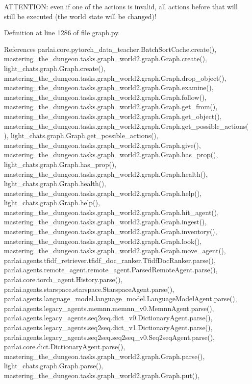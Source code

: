 \begin{DoxyVerb}ATTENTION: even if one of the actions is invalid, all actions before that will still be executed (the world state will be changed)!\end{DoxyVerb}
 

Definition at line 1286 of file graph.\+py.



References parlai.\+core.\+pytorch\+\_\+data\+\_\+teacher.\+Batch\+Sort\+Cache.\+create(), mastering\+\_\+the\+\_\+dungeon.\+tasks.\+graph\+\_\+world2.\+graph.\+Graph.\+create(), light\+\_\+chats.\+graph.\+Graph.\+create(), mastering\+\_\+the\+\_\+dungeon.\+tasks.\+graph\+\_\+world2.\+graph.\+Graph.\+drop\+\_\+object(), mastering\+\_\+the\+\_\+dungeon.\+tasks.\+graph\+\_\+world2.\+graph.\+Graph.\+examine(), mastering\+\_\+the\+\_\+dungeon.\+tasks.\+graph\+\_\+world2.\+graph.\+Graph.\+follow(), mastering\+\_\+the\+\_\+dungeon.\+tasks.\+graph\+\_\+world2.\+graph.\+Graph.\+get\+\_\+from(), mastering\+\_\+the\+\_\+dungeon.\+tasks.\+graph\+\_\+world2.\+graph.\+Graph.\+get\+\_\+object(), mastering\+\_\+the\+\_\+dungeon.\+tasks.\+graph\+\_\+world2.\+graph.\+Graph.\+get\+\_\+possible\+\_\+actions(), light\+\_\+chats.\+graph.\+Graph.\+get\+\_\+possible\+\_\+actions(), mastering\+\_\+the\+\_\+dungeon.\+tasks.\+graph\+\_\+world2.\+graph.\+Graph.\+give(), mastering\+\_\+the\+\_\+dungeon.\+tasks.\+graph\+\_\+world2.\+graph.\+Graph.\+has\+\_\+prop(), light\+\_\+chats.\+graph.\+Graph.\+has\+\_\+prop(), mastering\+\_\+the\+\_\+dungeon.\+tasks.\+graph\+\_\+world2.\+graph.\+Graph.\+health(), light\+\_\+chats.\+graph.\+Graph.\+health(), mastering\+\_\+the\+\_\+dungeon.\+tasks.\+graph\+\_\+world2.\+graph.\+Graph.\+help(), light\+\_\+chats.\+graph.\+Graph.\+help(), mastering\+\_\+the\+\_\+dungeon.\+tasks.\+graph\+\_\+world2.\+graph.\+Graph.\+hit\+\_\+agent(), mastering\+\_\+the\+\_\+dungeon.\+tasks.\+graph\+\_\+world2.\+graph.\+Graph.\+ingest(), mastering\+\_\+the\+\_\+dungeon.\+tasks.\+graph\+\_\+world2.\+graph.\+Graph.\+inventory(), mastering\+\_\+the\+\_\+dungeon.\+tasks.\+graph\+\_\+world2.\+graph.\+Graph.\+look(), mastering\+\_\+the\+\_\+dungeon.\+tasks.\+graph\+\_\+world2.\+graph.\+Graph.\+move\+\_\+agent(), parlai.\+agents.\+tfidf\+\_\+retriever.\+tfidf\+\_\+doc\+\_\+ranker.\+Tfidf\+Doc\+Ranker.\+parse(), parlai.\+agents.\+remote\+\_\+agent.\+remote\+\_\+agent.\+Parsed\+Remote\+Agent.\+parse(), parlai.\+core.\+torch\+\_\+agent.\+History.\+parse(), parlai.\+agents.\+starspace.\+starspace.\+Starspace\+Agent.\+parse(), parlai.\+agents.\+language\+\_\+model.\+language\+\_\+model.\+Language\+Model\+Agent.\+parse(), parlai.\+agents.\+legacy\+\_\+agents.\+memnn.\+memnn\+\_\+v0.\+Memnn\+Agent.\+parse(), parlai.\+agents.\+legacy\+\_\+agents.\+seq2seq.\+dict\+\_\+v0.\+Dictionary\+Agent.\+parse(), parlai.\+agents.\+legacy\+\_\+agents.\+seq2seq.\+dict\+\_\+v1.\+Dictionary\+Agent.\+parse(), parlai.\+agents.\+legacy\+\_\+agents.\+seq2seq.\+seq2seq\+\_\+v0.\+Seq2seq\+Agent.\+parse(), parlai.\+core.\+dict.\+Dictionary\+Agent.\+parse(), mastering\+\_\+the\+\_\+dungeon.\+tasks.\+graph\+\_\+world2.\+graph.\+Graph.\+parse(), light\+\_\+chats.\+graph.\+Graph.\+parse(), mastering\+\_\+the\+\_\+dungeon.\+tasks.\+graph\+\_\+world2.\+graph.\+Graph.\+put(), 